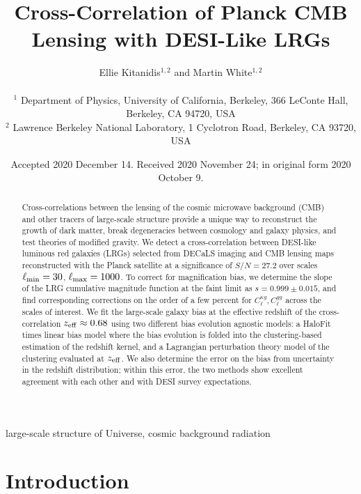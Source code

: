 \documentclass[a4paper,usenatbib]{mnras}
\title[DESI LRG $\times$ Planck lensing]{Cross-Correlation of Planck CMB Lensing with DESI-Like LRGs}
\author[E. Kitanidis et al.]{Ellie Kitanidis$^{1,2}$ and Martin White$^{1,2}$ \\ \\ 
$^{1}$ Department of Physics, University of California, Berkeley, 366 LeConte Hall, Berkeley, CA 94720, USA\\
$^{2}$ Lawrence Berkeley National Laboratory, 1 Cyclotron Road, Berkeley, CA 93720, USA\\}
\date{Accepted 2020 December 14. Received 2020 November 24; in original form 2020 October 9.}
\begin{document}
\label{firstpage}
\pagerange{\pageref{firstpage}--\pageref{lastpage}}
\maketitle

\begin{abstract}
Cross-correlations between the lensing of the cosmic microwave background (CMB) and other tracers of large-scale structure provide a unique way to reconstruct the growth of dark matter, break degeneracies between cosmology and galaxy physics, and test theories of modified gravity. We detect a cross-correlation between DESI-like luminous red galaxies (LRGs) selected from DECaLS imaging and CMB lensing maps reconstructed with the Planck satellite at a significance of $S/N = 27.2$ over scales $\ell_{\rm min} = 30$, $\ell_{\rm max} = 1000$. To correct for magnification bias, we determine the slope of the LRG cumulative magnitude function at the faint limit as $s = 0.999 \pm 0.015$, and find corresponding corrections on the order of a few percent for $C^{\kappa g}_{\ell}, C^{gg}_{\ell}$ across the scales of interest. We fit the large-scale galaxy bias at the effective redshift of the cross-correlation $z_{\rm eff} \approx 0.68$ using two different bias evolution agnostic models: a HaloFit times linear bias model where the bias evolution is folded into the clustering-based estimation of the redshift kernel, and a Lagrangian perturbation theory model of the clustering evaluated at $z_{\rm eff}$. We also determine the error on the bias from uncertainty in the redshift distribution; within this error, the two methods show excellent agreement with each other and with DESI survey expectations.
\end{abstract}

\begin{keywords}
large-scale structure of Universe, cosmic background radiation
\end{keywords}



\section{Introduction}
\end{document}
